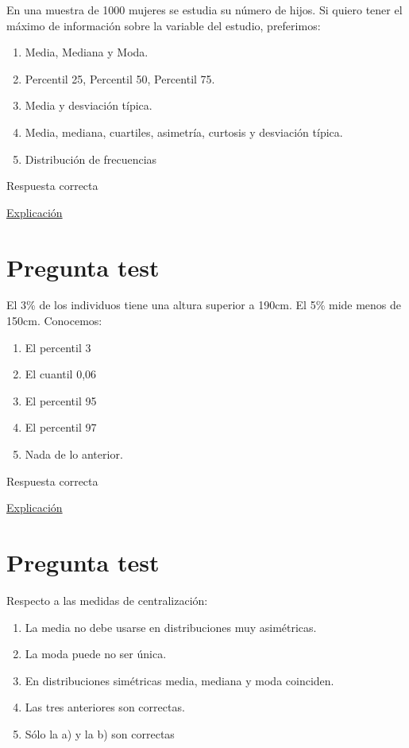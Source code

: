 \documentclass[
]{book}
\providecommand{\tightlist}{%
  \setlength{\itemsep}{0pt}\setlength{\parskip}{0pt}}
\begin{document}
En una muestra de 1000 mujeres se estudia su número de hijos. Si quiero tener el máximo de información sobre la variable del estudio, preferimos:

\begin{enumerate}
\def\labelenumi{\alph{enumi})}
\tightlist
\item
  Media, Mediana y Moda.
\item
  Percentil 25, Percentil 50, Percentil 75.
\item
  Media y desviación típica.
\item
  Media, mediana, cuartiles, asimetría, curtosis y desviación típica.
\item
  Distribución de frecuencias
\end{enumerate}

Respuesta correcta

\href{https://1fjmanzano.github.io/bioestadistica/tablas-de-frecuencias.html}{Explicación}

\hypertarget{pregunta-test-83}{%
\section{Pregunta test}\label{pregunta-test-83}}

El 3\% de los individuos tiene una altura superior a 190cm. El 5\% mide menos de 150cm. Conocemos:

\begin{enumerate}
\def\labelenumi{\alph{enumi})}
\tightlist
\item
  El percentil 3
\item
  El cuantil 0,06
\item
  El percentil 95
\item
  El percentil 97
\item
  Nada de lo anterior.
\end{enumerate}

Respuesta correcta

\href{https://1fjmanzano.github.io/bioestadistica/medidas-de-posicio\%CC\%81n-dispersio\%CC\%81n-y-forma.html\#medidas-de-posicio\%CC\%81n-no-centrales}{Explicación}

\hypertarget{pregunta-test-84}{%
\section{Pregunta test}\label{pregunta-test-84}}

Respecto a las medidas de centralización:

\begin{enumerate}
\def\labelenumi{\alph{enumi})}
\tightlist
\item
  La media no debe usarse en distribuciones muy asimétricas.
\item
  La moda puede no ser única.
\item
  En distribuciones simétricas media, mediana y moda coinciden.
\item
  Las tres anteriores son correctas.
\item
  Sólo la a) y la b) son correctas
\end{enumerate}
\end{document}
